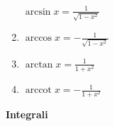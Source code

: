 \begin{center}
\begin{small}
\begin{enumerate}
\begin{math}
				      \arcsin x = \frac{1}{\sqrt {1 - x^2}}
			      \end{math}
			\item \begin{math}
				      \arccos x = - \frac{1}{\sqrt{1 - x^2}}
			      \end{math}
			\item \begin{math}
				      \arctan x = \frac{1}{1 + x^2}
			      \end{math}
			\item \begin{math}
				      \operatorname{arccot}x = -\frac{1}{1 + x^2}
			      \end{math}
		\end{enumerate}
	\end{small}
\end{center}
\textbf{Integrali}
